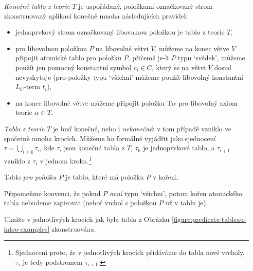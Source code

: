 \begin{definition}[Tablo]
    \emph{Konečné tablo z teorie $T$} je uspořádaný, položkami označkovaný strom zkonstruovaný aplikací konečně mnoha následujících pravidel:
    \begin{itemize}
        \item jednoprvkový strom označkovaný libovolnou položkou je tablo z teorie $T$,
        \item pro libovolnou položkou $P$ na libovolné větvi $V$, můžeme na konec větve $V$ připojit atomické tablo pro položku $P$, přičemž je-li $P$ typu `svědek', můžeme použít jen pomocný konstantní symbol $c_i\in C$, který se na větvi $V$ dosud nevyskytuje (pro položky typu `všichni' můžeme použít libovolný konstantní $L_C$-term $t_i$),
        \item na konec libovolné větve můžeme připojit položku $\mathrm{T}\alpha$ pro libovolný axiom teorie $\alpha\in T$.
    \end{itemize}
    \emph{Tablo z teorie $T$} je buď konečné, nebo i \emph{nekonečné}: v tom případě vzniklo ve spočetně mnoha krocích. Můžeme ho formálně vyjádřit jako sjednocení $\tau=\bigcup_{i\geq 0}\tau_i$, kde $\tau_i$ jsou konečná tabla z $T$, $\tau_0$ je jednoprvkové tablo, a $\tau_{i+1}$ vzniklo z $\tau_i$ v jednom kroku.\footnote{Sjednocení proto, že v jednotlivých krocích přidáváme do tabla nové vrcholy, $\tau_i$ je tedy podstromem $\tau_{i+1}$.}
    
    Tablo \emph{pro položku $P$} je tablo, které má položku $P$ v kořeni.
    \end{definition}
    
    Připomeňme konvenci, že pokud $P$ \emph{není} typu `všichni', potom kořen atomického tabla nebudeme zapisovat (neboť vrchol s položkou $P$ už v tablu je).

\begin{exercise}
    Ukažte v jednotlivých krocích jak byla tabla z Obrázku \ref{figure:predicate-tableau-intro-examples} zkonstruována.
\end{exercise}


